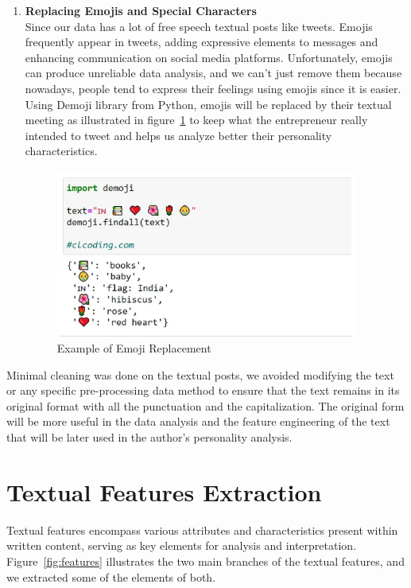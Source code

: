 \begin{enumerate}
\item \textbf{Replacing Emojis and Special Characters}\\
Since our data has a lot of free speech textual posts like tweets. Emojis frequently appear in tweets, adding expressive elements to messages and enhancing communication on social media platforms. Unfortunately, emojis can produce unreliable data analysis, and we can't just remove them because nowadays, people tend to express their feelings using emojis since it is easier. Using Demoji library from Python, emojis will be replaced by their textual meeting as illustrated in figure~\ref{fig:emojis} to keep what the entrepreneur really intended to tweet and helps us analyze better their personality characteristics.
\begin{figure}[H]
\centering
\includegraphics[width=10cm]{emojis}
\caption{Example of Emoji Replacement\cite{SarahDev_2023}}
\label{fig:emojis}
\end{figure}
\end{enumerate}

Minimal cleaning was done on the textual posts, we avoided modifying the text or any specific pre-processing data method to ensure that the text remains in its original format with all the punctuation and the capitalization. The original form will be more useful in the data analysis and the feature engineering of the text that will be later used in the author's personality analysis.

\section{Textual Features Extraction}
Textual features encompass various attributes and characteristics present within written content, serving as key elements for analysis and interpretation. Figure~\ref{fig:features} illustrates the two main branches of the textual features, and we extracted some of the elements of both\cite{litvinova2016profiling}.

